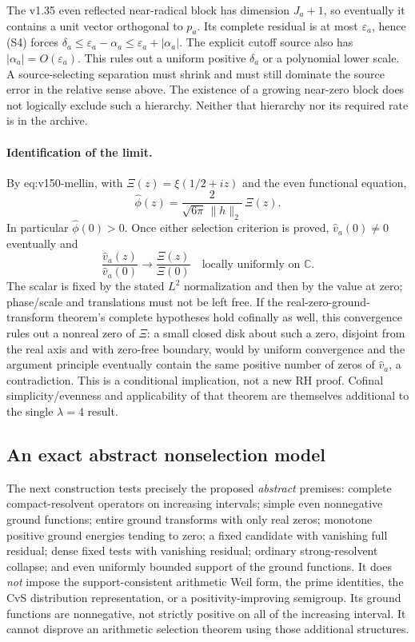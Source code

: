 The v1.35 even reflected near-radical block has dimension $J_a+1$,
so eventually it contains a unit vector orthogonal to $p_a$. Its complete
residual is at most $\varepsilon_a$, hence (S4) forces
$\delta_a\le\varepsilon_a-\alpha_a\le\varepsilon_a+|\alpha_a|$.
The explicit cutoff source also has $|\alpha_a|=O(\varepsilon_a)$.
This rules out a uniform positive $\delta_a$ or a polynomial lower scale.
A source-selecting separation must shrink and must still dominate the
source error in the relative sense above. The existence of a growing
near-zero block does not logically exclude such a hierarchy. Neither
that hierarchy nor its required rate is in the archive.

\paragraph{Identification of the limit.}
By \textup{eq:v150-mellin}, with
$\Xi(z)=\xi(1/2+iz)$ and the even functional equation,
\[
 \widehat\phi(z)=\frac{2}{\sqrt{6\pi}\,\|h\|_2}\,\Xi(z).
\]
In particular $\widehat\phi(0)>0$. Once either selection criterion is
proved, $\widehat v_a(0)\ne0$ eventually and
\[
 \frac{\widehat v_a(z)}{\widehat v_a(0)}
 \longrightarrow\frac{\Xi(z)}{\Xi(0)}
 \quad\text{locally uniformly on }\mathbb C.
\]
The scalar is fixed by the stated $L^2$ normalization and then by the
value at zero; phase/scale and translations must not be left free.
If the real-zero-ground-transform theorem's complete hypotheses hold
cofinally as well, this convergence rules out a nonreal zero of $\Xi$:
a small closed disk about such a zero, disjoint from the real axis and
with zero-free boundary, would by uniform convergence and the argument
principle eventually contain the same positive number of zeros of
$\widehat v_a$, a contradiction. This is a conditional implication,
not a new RH proof. Cofinal simplicity/evenness and applicability of
that theorem are themselves additional to the single $\lambda=4$ result.

\subsection*{An exact abstract nonselection model}

The next construction tests precisely the proposed \emph{abstract}
premises: complete compact-resolvent operators on increasing intervals;
simple even nonnegative ground functions; entire ground transforms with only real
zeros; monotone positive ground energies tending to zero; a fixed
candidate with vanishing full residual; dense fixed tests with vanishing
residual; ordinary strong-resolvent collapse; and even uniformly bounded
support of the ground functions. It does \emph{not} impose the
support-consistent arithmetic Weil form, the prime identities, the
CvS distribution representation, or a positivity-improving semigroup.
Its ground functions are nonnegative, not strictly positive on all of
the increasing interval. It cannot disprove an arithmetic
selection theorem using those additional structures.

